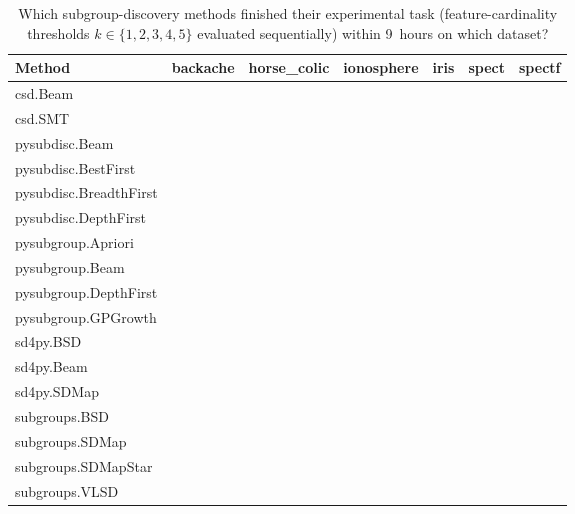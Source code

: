 \documentclass{article}
\begin{document}
\begin{table}[t]
	\centering
	\caption{Which subgroup-discovery methods finished their experimental task (feature-cardinality thresholds $k \in \{1, 2, 3, 4, 5\}$ evaluated sequentially) within 9~hours on which dataset?}
	\begin{tabular}{lllllll}
		\toprule
		Method & backache & horse\_colic & ionosphere & iris & spect & spectf \\
		\midrule
		csd.Beam & \checkmark & \checkmark & \checkmark & \checkmark & \checkmark & \checkmark \\
		csd.SMT & \checkmark & \checkmark & \checkmark & \checkmark & \checkmark &  \\
		pysubdisc.Beam & \checkmark & \checkmark & \checkmark & \checkmark & \checkmark & \checkmark \\
		pysubdisc.BestFirst & \checkmark & \checkmark &  & \checkmark & \checkmark &  \\
		pysubdisc.BreadthFirst & \checkmark & \checkmark &  & \checkmark & \checkmark &  \\
		pysubdisc.DepthFirst & \checkmark & \checkmark &  & \checkmark & \checkmark &  \\
		pysubgroup.Apriori &  &  &  & \checkmark & \checkmark &  \\
		pysubgroup.Beam & \checkmark & \checkmark & \checkmark & \checkmark & \checkmark & \checkmark \\
		pysubgroup.DepthFirst &  &  &  & \checkmark & \checkmark &  \\
		pysubgroup.GPGrowth &  &  &  & \checkmark &  &  \\
		sd4py.BSD & \checkmark & \checkmark & \checkmark & \checkmark & \checkmark & \checkmark \\
		sd4py.Beam & \checkmark & \checkmark & \checkmark & \checkmark & \checkmark & \checkmark \\
		sd4py.SDMap & \checkmark & \checkmark & \checkmark & \checkmark & \checkmark & \checkmark \\
		subgroups.BSD & \checkmark & \checkmark &  & \checkmark & \checkmark &  \\
		subgroups.SDMap &  &  &  & \checkmark &  &  \\
		subgroups.SDMapStar &  &  &  & \checkmark &  &  \\
		subgroups.VLSD &  &  &  & \checkmark &  &  \\
		\bottomrule
	\end{tabular}
	\label{tab:csd:competitor-timeouts}
\end{table}
\end{document}
